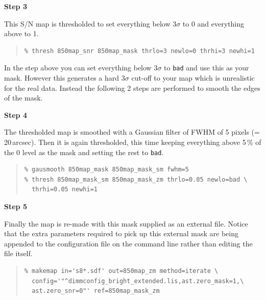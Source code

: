 \documentclass[twoside,11pt]{article}
\renewcommand{\_}{\texttt{\symbol{95}}}
\newenvironment{myquote}{\begin{quote}\begin{small}}{\end{small}\end{quote}}
\begin{document}
\begin{minipage}[t]{0.1\linewidth}
\textbf{Step 3}
\end{minipage}
\begin{minipage}[t]{0.9\linewidth}This S/N map is thresholded to set everything below
3$\sigma$ to 0 and everything above to 1.
\begin{myquote}
\begin{verbatim}
% thresh 850map_snr 850map_mask thrlo=3 newlo=0 thrhi=3 newhi=1
\end{verbatim}
\end{myquote}
In the step above you can set everything below 3$\sigma$ to
\texttt{bad} and use this as your mask. However this generates a hard
3$\sigma$ cut-off to your map which is unrealistic for the real data.
Instead the following 2 steps are performed to smooth the edges of the
mask.\\
\end{minipage}


\begin{minipage}[t]{0.1\linewidth}
\textbf{Step 4}
\end{minipage}
\begin{minipage}[t]{0.9\linewidth}The thresholded map is smoothed with a Gaussian filter
of FWHM of 5 pixels (=\,20\,arcsec). Then it is again thresholded, this time
keeping everything above 5\,\% of the 0 level as the mask and setting
the rest to \texttt{bad}.
\begin{myquote}
\begin{verbatim}
% gausmooth 850map_mask 850map_mask_sm fwhm=5
% thresh 850map_mask_sm 850map_mask_zm thrlo=0.05 newlo=bad \
  thrhi=0.05 newhi=1
\end{verbatim}
\end{myquote}
\end{minipage}


\begin{minipage}[t]{0.1\linewidth}
\textbf{Step 5}
\end{minipage}
\begin{minipage}[t]{0.9\linewidth}Finally the map is re-made with this mask supplied as an external
file. Notice that the extra parameters required to pick up this external
mask are being appended to the configuration file on the command line
rather than editing the file itself.
\begin{myquote}
\begin{verbatim}
% makemap in='s8*.sdf' out=850map_zm method=iterate \
  config='"^dimmconfig_bright_extended.lis,ast.zero_mask=1,\
  ast.zero_snr=0"' ref=850map_mask_zm
\end{verbatim}
\end{myquote}
\end{minipage}
\end{document}
